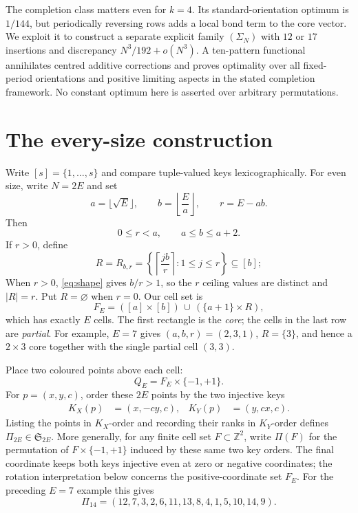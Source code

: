 \documentclass[11pt,letterpaper]{article}
\newcommand{\Ssym}{\mathfrak S}
\begin{document}
The completion class matters even for $k=4$.  Its standard-orientation
optimum is $1/144$, but periodically reversing rows adds a local bond term to
the core vector.  We exploit it to construct a separate explicit family
$(\Sigma_N)$ with $12$ or $17$ insertions and discrepancy
$N^3/192+o(N^3)$.  A ten-pattern functional annihilates centred additive
corrections and proves optimality over all fixed-period orientations and
positive limiting aspects in the stated completion framework.  No constant
optimum here is asserted over arbitrary permutations.
\section{The every-size construction}\label{sec:construction}

Write $[s]=\{1,\ldots,s\}$ and compare tuple-valued keys
lexicographically.  For even size, write $N=2E$ and set
\[
 a=\lfloor\sqrt E\rfloor,
 \qquad b=\left\lfloor\frac Ea\right\rfloor,
 \qquad r=E-ab.
\]
Then
\begin{equation}\label{eq:shape}
 0\leq r<a,
 \qquad a\leq b\leq a+2.
\end{equation}
If $r>0$, define
\[
 R=R_{b,r}
   =\left\{\left\lceil\frac{jb}{r}\right\rceil:1\leq j\leq r\right\}
   \subseteq[b];
\]
When $r>0$, \eqref{eq:shape} gives $b/r>1$, so the $r$ ceiling values
are distinct and $|R|=r$.  Put $R=\varnothing$ when $r=0$.  Our cell set is
\[
 F_E=([a]\times[b])\,\cup\,(\{a+1\}\times R),
\]
which has exactly $E$ cells.  The first rectangle is the \emph{core};
the cells in the last row are \emph{partial}.
For example, $E=7$ gives $(a,b,r)=(2,3,1)$, $R=\{3\}$, and hence a
$2\times3$ core together with the single partial cell $(3,3)$.

Place two coloured points above each cell:
\[
 Q_E=F_E\times\{-1,+1\}.
\]
For $p=(x,y,c)$, order these $2E$ points by the two injective keys
\begin{align}
 K_X(p)&=(x,-cy,c),
 &K_Y(p)&=(y,cx,c).                         \label{eq:keys}
\end{align}
Listing the points in $K_X$-order and recording their ranks in
$K_Y$-order defines $\Pi_{2E}\in\Ssym_{2E}$.  More generally, for any
finite cell set $F\subset\mathbb Z^2$, write $\Pi(F)$ for the permutation
of $F\times\{-1,+1\}$ induced by these same two key orders.  The final
coordinate keeps both keys injective even at zero or negative coordinates;
the rotation interpretation below concerns the positive-coordinate set $F_E$.
For the preceding $E=7$ example this gives
\[
 \Pi_{14}=(12,7,3,2,6,11,13,8,4,1,5,10,14,9).
\]
\end{document}
